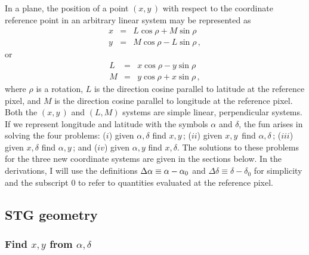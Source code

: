      In a plane, the position of a point $(x,y\,)$ with respect to the
coordinate reference point in an arbitrary linear system may be
represented as
\begin{equation}
\begin{array}{lcl}
  x & = &L\cos\rho+M\sin\rho \\
  y & = &M\cos\rho-L\sin\rho \, ,
\end{array}
\label{eq:xy=LM}
\end{equation}
or
\begin{equation}
\begin{array}{lcl}
  L & = &x\cos\rho - y \sin\rho \\
  M & = &y\cos\rho + x \sin\rho \, ,
\end{array}
\label{eq:LM=xy}
\end{equation}
where $\rho$ is a rotation, $L$ is the direction cosine parallel to
latitude at the reference pixel, and $M$ is the direction cosine
parallel to longitude at the reference pixel.  Both the $(x,y\,)$ and
$(L,M)$ systems are simple linear, perpendicular systems.  If we
represent longitude and latitude with the symbols $\alpha$ and
$\delta$, the fun arises in solving the four problems: ($i$) given
$\alpha,\delta$ find  $x,y\,$; ($ii$) given $x,y\,$ find
$\alpha,\delta\,$; ($iii$) given $x,\delta$ find $\alpha,y\,$; and
($iv$) given $\alpha,y$ find $x,\delta$.  The solutions to these
problems for the three new coordinate systems are given in the
sections below.  In the derivations, I will use the definitions
$\Delta\alpha \equiv \alpha - \alpha_0$ and $\Delta\delta \equiv
\delta - \delta_0$ for simplicity and the subscript $0$ to refer to
quantities evaluated at the reference pixel.

\subsection{STG geometry}
\subsubsection{Find $x,y$ from $\alpha,\delta$}

